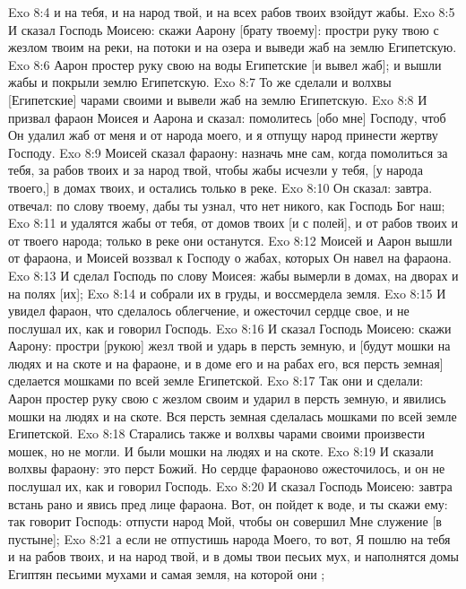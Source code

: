 \vs Exo 8:4 и на тебя, и на народ твой, и на всех рабов твоих взойдут жабы.
\vs Exo 8:5 И сказал Господь Моисею: скажи Аарону [брату твоему]: простри руку твою с жезлом твоим на реки, на потоки и на озера и выведи жаб на землю Египетскую.
\vs Exo 8:6 Аарон простер руку свою на воды Египетские [и вывел жаб]; и вышли жабы и покрыли землю Египетскую.
\vs Exo 8:7 То же сделали и волхвы [Египетские] чарами своими и вывели жаб на землю Египетскую.
\vs Exo 8:8 И призвал фараон Моисея и Аарона и сказал: помолитесь [обо мне] Господу, чтоб Он удалил жаб от меня и от народа моего, и я отпущу народ  принести жертву Господу.
\vs Exo 8:9 Моисей сказал фараону: назначь мне сам, когда помолиться за тебя, за рабов твоих и за народ твой, чтобы жабы исчезли у тебя, [у народа твоего,] в домах твоих, и остались только в реке.
\vs Exo 8:10 Он сказал: завтра.  отвечал:  по слову твоему, дабы ты узнал, что нет никого, как Господь Бог наш;
\vs Exo 8:11 и удалятся жабы от тебя, от домов твоих [и с полей], и от рабов твоих и от твоего народа; только в реке они останутся.
\vs Exo 8:12 Моисей и Аарон вышли от фараона, и Моисей воззвал к Господу о жабах, которых Он навел на фараона.
\vs Exo 8:13 И сделал Господь по слову Моисея: жабы вымерли в домах, на дворах и на полях [их];
\vs Exo 8:14 и собрали их в груды, и воссмердела земля.
\vs Exo 8:15 И увидел фараон, что сделалось облегчение, и ожесточил сердце свое, и не послушал их, как и говорил Господь.
\rsbpar\vs Exo 8:16 И сказал Господь Моисею: скажи Аарону: простри [рукою] жезл твой и ударь в персть земную, и [будут мошки на людях и на скоте и на фараоне, и в доме его и на рабах его, вся персть земная] сделается мошками по всей земле Египетской.
\vs Exo 8:17 Так они и сделали: Аарон простер руку свою с жезлом своим и ударил в персть земную, и явились мошки на людях и на скоте. Вся персть земная сделалась мошками по всей земле Египетской.
\vs Exo 8:18 Старались также и волхвы чарами своими произвести мошек, но не могли. И были мошки на людях и на скоте.
\vs Exo 8:19 И сказали волхвы фараону: это перст Божий. Но сердце фараоново ожесточилось, и он не послушал их, как и говорил Господь.
\rsbpar\vs Exo 8:20 И сказал Господь Моисею: завтра встань рано и явись пред лице фараона. Вот, он пойдет к воде, и ты скажи ему: так говорит Господь: отпусти народ Мой, чтобы он совершил Мне служение [в пустыне];
\vs Exo 8:21 а если не отпустишь народа Моего, то вот, Я пошлю на тебя и на рабов твоих, и на народ твой, и в домы твои песьих мух, и наполнятся домы Египтян песьими мухами и самая земля, на которой они ;
